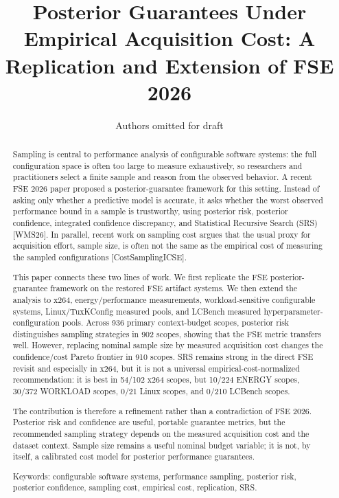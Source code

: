 \documentclass[smallcondensed]{svjour3}
\institute{Authors omitted for review}
\title{Posterior Guarantees Under Empirical Acquisition Cost: A
Replication and Extension of FSE 2026}
\author{Authors omitted for draft}
\date{}
\begin{document}
\maketitle

\begin{abstract}

Sampling is central to performance analysis of configurable software
systems: the full configuration space is often too large to measure
exhaustively, so researchers and practitioners select a finite sample
and reason from the observed behavior. A recent FSE 2026 paper proposed
a posterior-guarantee framework for this setting. Instead of asking only
whether a predictive model is accurate, it asks whether the worst
observed performance bound in a sample is trustworthy, using posterior
risk, posterior confidence, integrated confidence discrepancy, and
Statistical Recursive Search (SRS) {[}WMS26{]}. In parallel, recent work
on sampling cost argues that the usual proxy for acquisition effort,
sample size, is often not the same as the empirical cost of measuring
the sampled configurations {[}CostSamplingICSE{]}.

This paper connects these two lines of work. We first replicate the FSE
posterior-guarantee framework on the restored FSE artifact systems. We
then extend the analysis to x264, energy/performance measurements,
workload-sensitive configurable systems, Linux/TuxKConfig measured
pools, and LCBench measured hyperparameter-configuration pools. Across
936 primary context-budget scopes, posterior risk distinguishes sampling
strategies in 902 scopes, showing that the FSE metric transfers well.
However, replacing nominal sample size by measured acquisition cost
changes the confidence/cost Pareto frontier in 910 scopes. SRS remains
strong in the direct FSE revisit and especially in x264, but it is not a
universal empirical-cost-normalized recommendation: it is best in 54/102
x264 scopes, but 10/224 ENERGY scopes, 30/372 WORKLOAD scopes, 0/21
Linux scopes, and 0/210 LCBench scopes.

The contribution is therefore a refinement rather than a contradiction
of FSE 2026. Posterior risk and confidence are useful, portable
guarantee metrics, but the recommended sampling strategy depends on the
measured acquisition cost and the dataset context. Sample size remains a
useful nominal budget variable; it is not, by itself, a calibrated cost
model for posterior performance guarantees.

Keywords: configurable software systems, performance sampling, posterior
risk, posterior confidence, sampling cost, empirical cost, replication,
SRS.

\end{abstract}
\end{document}
